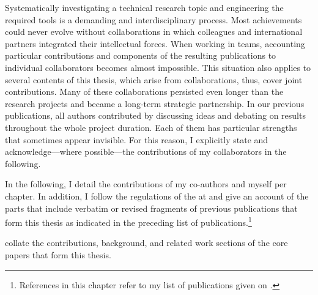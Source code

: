 
\label{ch:Collaborations}

Systematically investigating a technical research topic and engineering the required tools is a demanding and interdisciplinary process. Most achievements could never evolve without collaborations in which colleagues and international partners integrated their intellectual forces. When working in teams, accounting particular contributions and components of the resulting publications to individual collaborators becomes almost impossible. This situation also applies to several contents of this thesis, which arise from collaborations, thus, cover joint contributions. Many of these collaborations persisted even longer than the research projects and became a long-term strategic partnership.
In our previous publications, all authors contributed by discussing ideas and debating on results throughout the whole project duration. Each of them has particular strengths that sometimes appear invisible. For this reason, I explicitly state and acknowledge---where possible---the contributions of my collaborators in the following.

In the following, I detail the contributions of my co-authors and myself per chapter. In addition, I follow the regulations of the \myFaculty at \myUni and give an account of the parts that include verbatim or revised fragments of previous publications that form this thesis as indicated in the preceding list of publications.\footnote{References in this chapter refer to my list of publications given on .}

\sloppy

 collate the contributions, background, and related work sections of the core papers that form this thesis.%


\fussy

\label{ch:CollaborationsEnd}
